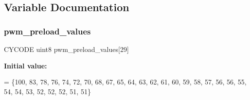 \subsection{Variable Documentation}
\mbox{\label{interruptions_8c_a82beecb0593499956eb3ee6fdf734a76}} 
\subsubsection{pwm\+\_\+preload\+\_\+values}
{\footnotesize\ttfamily C\+Y\+C\+O\+DE uint8 pwm\+\_\+preload\+\_\+values[29]}

{\bfseries Initial value\+:}
\begin{DoxyCode}
= \{100,    
                                        83,
                                        78,
                                        76,
                                        74,
                                        72,    
                                        70,
                                        68,
                                        67,
                                        65,
                                        64,    
                                        63,
                                        62,
                                        61,
                                        60,
                                        59,    
                                        58,
                                        57,
                                        56,
                                        56,
                                        55,    
                                        54,
                                        54,
                                        53,
                                        52,
                                        52,    
                                        52,
                                        51,
                                        51\}
\end{DoxyCode}

